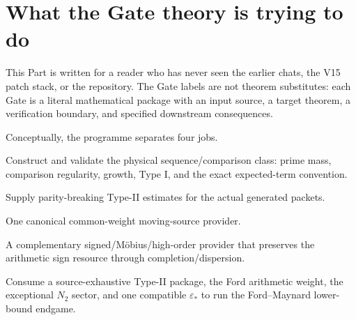 \documentclass[11pt]{article}
\theoremstyle{definition}
\newcommand{\1}{\mathbf 1}
\begin{document}
\section{What the Gate theory is trying to do}
\label{sec:theory-purpose}

This Part is written for a reader who has never seen the earlier chats, the V15 patch stack,
or the repository.  The Gate labels are not theorem substitutes: each Gate is a literal
mathematical package with an input source, a target theorem, a verification boundary, and
specified downstream consequences.

Conceptually, the programme separates four jobs.

\begin{description}[leftmargin=2.3cm,style=nextline]
\item[Gate 0.] Construct and validate the physical sequence/comparison class: prime mass,
comparison regularity, growth, Type I, and the exact expected-term convention.
\item[Gate 1.] Supply parity-breaking Type-II estimates for the actual generated packets.
\item[Gate 1A.] One canonical common-weight moving-source provider.
\item[Gate 1B.] A complementary signed/M\"obius/high-order provider that preserves the
arithmetic sign resource through completion/dispersion.
\item[Gate 2.] Consume a source-exhaustive Type-II package, the Ford arithmetic weight,
the exceptional $N_2$ sector, and one compatible $\varepsilon_\ast$ to run the
Ford--Maynard lower-bound endgame.
\end{description}
\end{document}

